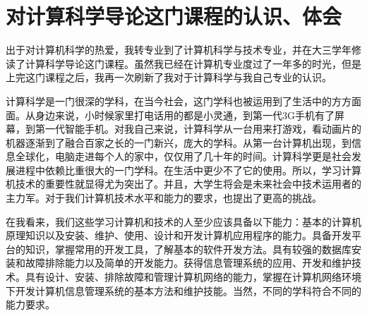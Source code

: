\documentclass{article}
\begin{document}
\section{对计算科学导论这门课程的认识、体会}
出于对计算机科学的热爱，我转专业到了计算机科学与技术专业，并在大三学年修读了计算科学导论这门课程。虽然我已经在计算机专业度过了一年多的时光，但是上完这门课程之后，我再一次刷新了我对于计算科学与我自己专业的认识。\par
计算科学是一门很深的学科，在当今社会，这门学科也被运用到了生活中的方方面面。从身边来说，小时候家里打电话用的都是小灵通，到第一代3G手机有了屏幕，到第一代智能手机。对我自己来说，计算科学从一台用来打游戏，看动画片的机器逐渐到了融合百家之长的一门新兴，庞大的学科。从第一台计算机出现，到信息全球化，电脑走进每个人的家中，仅仅用了几十年的时间。计算科学更是社会发展进程中依赖比重很大的一门学科。在生活中更少不了它的使用。所以，学习计算机技术的重要性就显得尤为突出了。并且，大学生将会是未来社会中技术运用者的主力军。对于我们计算机技术水平和能力的要求，也提出了更高的挑战。\par
在我看来，我们这些学习计算机和技术的人至少应该具备以下能力：基本的计算机原理知识以及安装、维护、使用、设计和开发计算机应用程序的能力。具备开发平台的知识，掌握常用的开发工具，了解基本的软件开发方法。具有较强的数据库安装和故障排除能力以及简单的开发能力。获得信息管理系统的应用、开发和维护技术。具有设计、安装、排除故障和管理计算机网络的能力，掌握在计算机网络环境下开发计算机信息管理系统的基本方法和维护技能。当然，不同的学科符合不同的能力要求。
\end{document}
